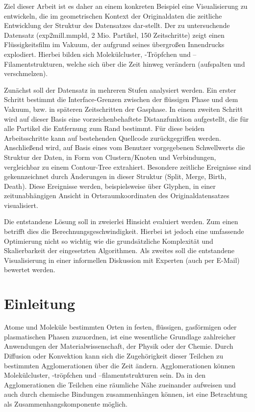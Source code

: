 Ziel dieser Arbeit ist es daher an einem konkreten Beispiel eine Visualisierung zu entwickeln, die im geometrischen Kontext der Originaldaten die zeitliche Entwicklung der Struktur des Datensatzes dar-stellt. Der zu untersuchende Datensatz (exp2mill.mmpld, 2 Mio. Partikel, 150 Zeitschritte) zeigt einen Flüssigkeitsfilm im Vakuum, der aufgrund seines übergroßen Innendrucks explodiert. Hierbei bilden sich Molekülcluster, -Tröpfchen und –Filamentstrukturen, welche sich über die Zeit hinweg verändern (aufspalten und verschmelzen).

Zunächst soll der Datensatz in mehreren Stufen analysiert werden. Ein erster Schritt bestimmt die Interface-Grenzen zwischen der flüssigen Phase und dem Vakuum, bzw. in späteren Zeitschritten der Gasphase. In einem zweiten Schritt wird auf dieser Basis eine vorzeichenbehaftete Distanzfunktion aufgestellt, die für alle Partikel die Entfernung zum Rand bestimmt. Für diese beiden Arbeitsschritte kann auf bestehenden Quellcode zurückgegriffen werden. Anschließend wird, auf Basis eines vom Benutzer vorgegebenen Schwellwerts die Struktur der Daten, in Form von Clustern/Knoten und Verbindungen, vergleichbar zu einem Contour-Tree extrahiert. Besondere zeitliche Ereignisse sind gekennzeichnet durch Änderungen in dieser Struktur (Split, Merge, Birth, Death). Diese Ereignisse werden, beispielsweise über Glyphen, in einer zeitunabhängigen Ansicht in Ortsraumkoordinaten des Originaldatensatzes visualisiert.

Die entstandene Lösung soll in zweierlei Hinsicht evaluiert werden. Zum einen betrifft dies die Berechnungsgeschwindigkeit. Hierbei ist jedoch eine umfassende Optimierung nicht so wichtig wie die grundsätzliche Komplexität und Skalierbarkeit der eingesetzten Algorithmen. Als zweites soll die entstandene Visualisierung in einer informellen Diskussion mit Experten (auch per E-Mail) bewertet werden.


\chapter{Einleitung}

Atome und Moleküle bestimmten Orten in festen, flüssigen, gasförmigen oder plasmatischen Phasen zuzuordnen, ist eine wesentliche Grundlage zahlreicher Anwendungen der Materialwissenschaft, der Physik oder der Chemie. %
Durch Diffusion oder Konvektion kann sich die Zugehörigkeit dieser Teilchen zu bestimmten Agglomerationen über die Zeit ändern. Agglomerationen können Molekülcluster, -tröpfchen und –filamentstrukturen sein. Da in den Agglomerationen die Teilchen eine räumliche Nähe zueinander aufweisen und auch durch chemische Bindungen zusammenhängen können, ist eine Betrachtung als Zusammenhangskomponente möglich.

